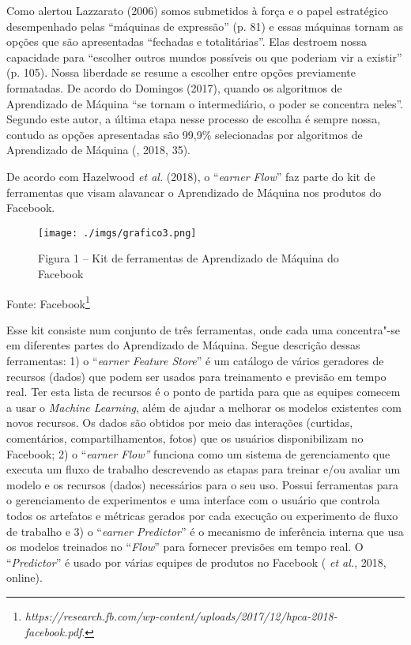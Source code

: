 Como alertou Lazzarato (2006) somos submetidos à força e o papel
estratégico desempenhado pelas ``máquinas de expressão'' (p. 81) e essas
máquinas tornam as opções que são apresentadas ``fechadas e
totalitárias''. Elas destroem nossa capacidade para ``escolher outros
mundos possíveis ou que poderiam vir a existir'' (p. 105). Nossa
liberdade se resume a escolher entre opções previamente formatadas. De
acordo do Domingos (2017), quando os algoritmos de Aprendizado de
Máquina ``se tornam o intermediário, o poder se concentra neles''.
Segundo este autor, a última etapa nesse processo de escolha é sempre
nossa, contudo as opções apresentadas são 99,9\% selecionadas por
algoritmos de Aprendizado de Máquina (, 2018, 35).

De acordo com Hazelwood \emph{et al.} (2018), o ``\emph{earner Flow}'' faz
parte do kit de ferramentas que visam alavancar o Aprendizado de Máquina
nos produtos do Facebook.

\begin{figure}[!ht]
\centering
  \texttt{[image: ./imgs/grafico3.png]}
\caption{Figura 1 -- Kit de ferramentas de Aprendizado de Máquina do Facebook}
 \end{figure}

Fonte: Facebook\footnote{\emph{https://research.fb.com/wp-content/uploads/2017/12/hpca-2018-facebook.pdf}.}

Esse kit consiste num conjunto de três ferramentas, onde cada uma
concentra"-se em diferentes partes do Aprendizado de Máquina. Segue
descrição dessas ferramentas: 1) o ``\emph{earner Feature Store}'' é
um catálogo de vários geradores de recursos (dados) que podem ser usados
para treinamento e previsão em tempo real. Ter esta lista de recursos é
o ponto de partida para que as equipes comecem a usar o \emph{Machine
Learning}, além de ajudar a melhorar os modelos existentes com novos
recursos. Os dados são obtidos por meio das interações (curtidas,
comentários, compartilhamentos, fotos) que os usuários disponibilizam no
Facebook; 2) o ``\emph{earner Flow''} funciona como um sistema de
gerenciamento que executa um fluxo de trabalho descrevendo as etapas
para treinar e/ou avaliar um modelo e os recursos (dados) necessários
para o seu uso. Possui ferramentas para o gerenciamento de experimentos
e uma interface com o usuário que controla todos os artefatos e métricas
gerados por cada execução ou experimento de fluxo de trabalho e 3) o
``\emph{earner Predictor}'' é o mecanismo de inferência interna que
usa os modelos treinados no ``\emph{Flow}'' para fornecer previsões em
tempo real. O ``\emph{Predictor}'' é usado por várias equipes de
produtos no Facebook ( \emph{et al.}, 2018, online).

